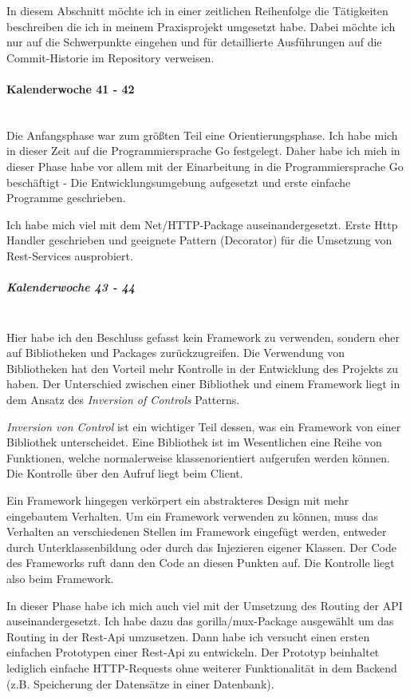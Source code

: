\documentclass[12pt]{article}
\begin{document}
In diesem Abschnitt möchte ich in einer zeitlichen Reihenfolge die Tätigkeiten beschreiben die ich in meinem Praxisprojekt umgesetzt habe. Dabei möchte ich nur auf die Schwerpunkte eingehen und für detaillierte Ausführungen auf die Commit-Historie im Repository verweisen.

\paragraph{Kalenderwoche 41 - 42}\mbox{}\\

Die Anfangsphase war zum größten Teil eine Orientierungsphase. Ich habe mich in dieser Zeit auf die Programmiersprache Go festgelegt. Daher habe ich mich in dieser Phase habe vor allem mit der Einarbeitung in die Programmiersprache Go beschäftigt - Die Entwicklungsumgebung aufgesetzt und erste einfache Programme geschrieben.

Ich habe mich viel mit dem Net/HTTP-Package\cite{HTTP} auseinandergesetzt. Erste Http Handler geschrieben und geeignete Pattern (Decorator) für die Umsetzung von Rest-Services ausprobiert.

\subparagraph{Kalenderwoche 43 - 44}\mbox{}\\

Hier habe ich den Beschluss gefasst kein Framework zu verwenden, sondern eher auf Bibliotheken und Packages zurückzugreifen. Die Verwendung von Bibliotheken hat den Vorteil mehr Kontrolle in der Entwicklung des Projekts zu haben. Der Unterschied zwischen einer Bibliothek und einem Framework liegt in dem Ansatz des \textit{Inversion of Controls} Patterns.

\textit{Inversion von Control} ist ein wichtiger Teil dessen, was ein Framework von einer Bibliothek unterscheidet. Eine Bibliothek ist im Wesentlichen eine Reihe von Funktionen, welche normalerweise klassenorientiert aufgerufen werden können. Die Kontrolle über den Aufruf liegt beim Client.

Ein Framework hingegen verkörpert ein abstrakteres Design mit mehr eingebautem Verhalten. Um ein Framework verwenden zu können, muss das Verhalten an verschiedenen Stellen im Framework eingefügt werden, entweder durch Unterklassenbildung oder durch das Injezieren eigener Klassen. Der Code des Frameworks ruft dann den Code an diesen Punkten auf. Die Kontrolle liegt also beim Framework.

In dieser Phase habe ich mich auch viel mit der Umsetzung des Routing der API auseinandergesetzt. Ich habe dazu das gorilla/mux-Package \cite{MUX} ausgewählt um das Routing in der Rest-Api umzusetzen.
Dann habe ich versucht einen ersten einfachen Prototypen einer Rest-Api zu entwickeln. Der Prototyp beinhaltet lediglich einfache HTTP-Requests ohne weiterer Funktionalität in dem Backend (z.B. Speicherung der Datensätze in einer Datenbank).
\end{document}
